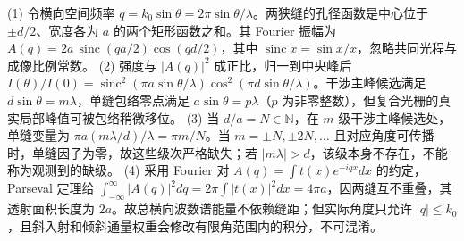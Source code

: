 (1) 令横向空间频率 \(q=k_0\sin\theta=2\pi\sin\theta/\lambda\)。两狭缝的孔径函数是中心位于 \(\pm d/2\)、宽度各为 \(a\) 的两个矩形函数之和。其 Fourier 振幅为 \(A(q)=2a\,\operatorname{sinc}(qa/2)\cos(qd/2)\)，其中 \(\operatorname{sinc}x=\sin x/x\)，忽略共同光程与成像比例常数。
(2) 强度与 \(|A(q)|^2\) 成正比，归一到中央峰后 \(I(\theta)/I(0)=\operatorname{sinc}^2(\pi a\sin\theta/\lambda)\cos^2(\pi d\sin\theta/\lambda)\)。干涉主峰候选满足 \(d\sin\theta=m\lambda\)，单缝包络零点满足 \(a\sin\theta=p\lambda\)（\(p\) 为非零整数），但复合光栅的真实局部峰值可被包络稍微移位。
(3) 当 \(d/a=N\in\mathbb N\)，在 \(m\) 级干涉主峰候选处，单缝变量为 \(\pi a(m\lambda/d)/\lambda=\pi m/N\)。当 \(m=\pm N,\pm2N,\ldots\) 且对应角度可传播时，单缝因子为零，故这些级次严格缺失；若 \(|m\lambda|>d\)，该级本身不存在，不能称为观测到的缺级。
(4) 采用 Fourier 对 \(A(q)=\int t(x)e^{-iqx}dx\) 的约定，Parseval 定理给 \(\int_{-\infty}^{\infty}|A(q)|^2dq=2\pi\int|t(x)|^2dx=4\pi a\)，因两缝互不重叠，其透射面积长度为 \(2a\)。故总横向波数谱能量不依赖缝距；但实际角度只允许 \(|q|\le k_0\)，且斜入射和倾斜通量权重会修改有限角范围内的积分，不可混淆。
